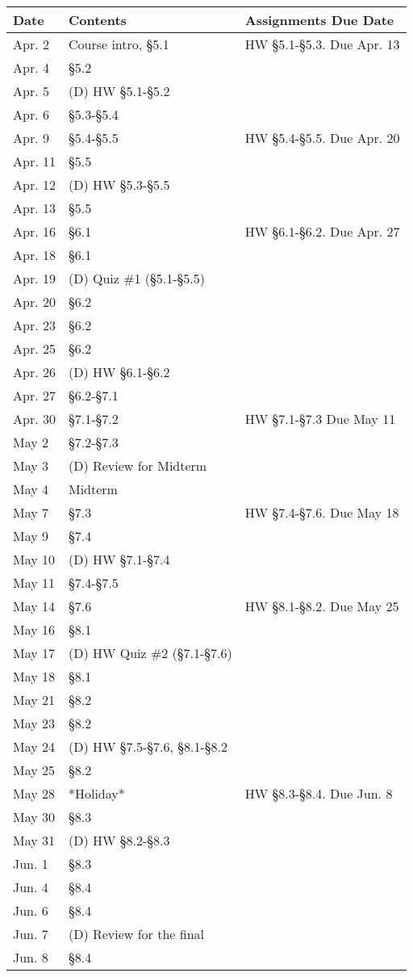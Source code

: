 \documentclass[10pt]{amsart}%
\begin{document}
%
\normalsize%
\begin{tabular}{|l|l|l|}%
\hline%
\textbf{Date}&\textbf{Contents}&\textbf{Assignments Due Date}\\%
\hline%
Apr. 2&Course intro, \S5.1&HW \S5.1-\S5.3. Due Apr. 13\\%
Apr. 4&\S5.2&\\%
Apr. 5&(D) HW \S5.1-\S5.2&\\%
Apr. 6&\S5.3-\S5.4&\\%
\hline%
Apr. 9&\S5.4-\S5.5&HW \S5.4-\S5.5. Due Apr. 20\\%
Apr. 11&\S5.5&\\%
Apr. 12&(D) HW \S5.3-\S5.5&\\%
Apr. 13&\S5.5&\\%
\hline%
Apr. 16&\S6.1&HW \S6.1-\S6.2. Due Apr. 27\\%
Apr. 18&\S6.1&\\%
Apr. 19&(D) Quiz \#1 (\S5.1-\S5.5)&\\%
Apr. 20&\S6.2&\\%
\hline%
Apr. 23&\S6.2&\\%
Apr. 25&\S6.2&\\%
Apr. 26&(D) HW \S6.1-\S6.2&\\%
Apr. 27&\S6.2-\S7.1&\\%
\hline%
Apr. 30&\S7.1-\S7.2&HW \S7.1-\S7.3 Due May 11\\%
May 2&\S7.2-\S7.3&\\%
May 3&(D) Review for Midterm&\\%
May 4&Midterm&\\%
\hline%
May 7&\S7.3&HW \S7.4-\S7.6. Due May 18\\%
May 9&\S7.4&\\%
May 10&(D) HW \S7.1-\S7.4&\\%
May 11&\S7.4-\S7.5&\\%
\hline%
May 14&\S7.6&HW \S8.1-\S8.2. Due May 25\\%
May 16&\S8.1&\\%
May 17&(D) HW Quiz \#2 (\S7.1-\S7.6)&\\%
May 18&\S8.1&\\%
\hline%
May 21&\S8.2&\\%
May 23&\S8.2&\\%
May 24&(D) HW \S7.5-\S7.6, \S8.1-\S8.2&\\%
May 25&\S8.2&\\%
\hline%
May 28&*Holiday*&HW \S8.3-\S8.4. Due Jun. 8\\%
May 30&\S8.3&\\%
May 31&(D) HW \S8.2-\S8.3&\\%
Jun. 1&\S8.3&\\%
\hline%
Jun. 4&\S8.4&\\%
Jun. 6&\S8.4&\\%
Jun. 7&(D) Review for the final&\\%
Jun. 8&\S8.4&\\%
\hline%
\end{tabular}%
\end{document}
